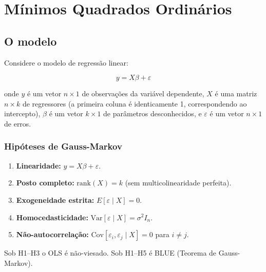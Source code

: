 \chapter{Mínimos Quadrados Ordinários}
\label{cap:ols}

\section{O modelo}

Considere o modelo de regressão linear:

\[
  y = X\beta + \varepsilon
\]

onde $y$ é um vetor $n \times 1$ de observações da variável dependente,
$X$ é uma matriz $n \times k$ de regressores (a primeira coluna é
identicamente 1, correspondendo ao intercepto), $\beta$ é um vetor
$k \times 1$ de parâmetros desconhecidos, e $\varepsilon$ é um vetor
$n \times 1$ de erros.

\subsection*{Hipóteses de Gauss-Markov}

\begin{enumerate}
  \item \textbf{Linearidade:} $y = X\beta + \varepsilon$.
  \item \textbf{Posto completo:} $\mathrm{rank}(X) = k$ (sem multicolinearidade perfeita).
  \item \textbf{Exogeneidade estrita:} $E[\varepsilon \mid X] = 0$.
  \item \textbf{Homocedasticidade:} $\mathrm{Var}[\varepsilon \mid X] = \sigma^2 I_n$.
  \item \textbf{Não-autocorrelação:} $\mathrm{Cov}[\varepsilon_i, \varepsilon_j \mid X] = 0$ para $i \neq j$.
\end{enumerate}

Sob H1–H3 o OLS é não-viesado. Sob H1–H5 é BLUE (Teorema de Gauss-Markov).

